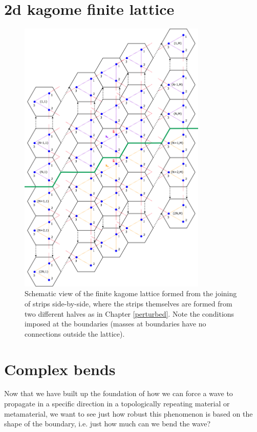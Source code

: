\section{2d kagome finite lattice}
\begin{figure}[!h]
\centering
\includegraphics[width=0.8\textwidth]{imgs/kagomefinitemodel.png}
\caption{\label{fig:kagomefinscheme} Schematic view of the finite kagome
  lattice formed from the joining of strips side-by-side, where the strips
  themselves are formed from two different halves as in Chapter
  \ref{perturbed}. Note the conditions imposed at the boundaries (masses at
  boundaries have no connections outside the lattice).}
\end{figure}

\section{Complex bends}
\label{complexbends}
Now that we have built up the foundation of how we can force a wave to
propagate in a specific direction in a topologically repeating material or
metamaterial, we want to see just how robust this phenomenon is based on the
shape of the boundary, i.e. just how much can we bend the wave?

